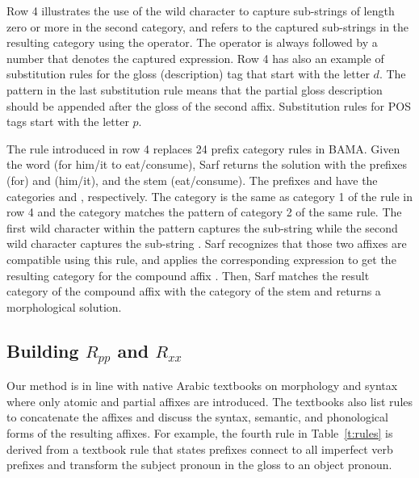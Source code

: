 Row 4 illustrates the use of the wild character \chci{*} to capture sub-strings of length zero or more in the second category,
and refers to the captured sub-strings in the resulting category using the  operator. 
The  operator is always followed by a number that denotes the captured \chci{*} expression.
Row 4 has also an example of substitution rules for the gloss (description) tag that start with the letter $d$.
The  pattern in the last substitution rule means that the  partial gloss description should be appended after the gloss 
of the second affix.
Substitution rules for POS tags start with the letter $p$.

The rule introduced in row 4 replaces 24 prefix category rules in BAMA. 
Given the word  (for him/it to eat/consume), 
Sarf returns the solution with the prefixes  (for) and  (him/it), 
and the stem  (eat/consume). 
The prefixes  and  have the categories 
 and , respectively. 
The category  is the same as category 1 of the rule in row 4 and 
the category  matches the pattern of category 2 of the same rule. 
The first wild character within the pattern captures the sub-string  
while the second wild character captures the sub-string . 
Sarf recognizes that those two affixes are compatible using this rule, 
and applies the corresponding expression to get the resulting category 
 for the compound affix . 
Then, Sarf matches the result category of the compound affix 
with the category  of the stem  
and returns a morphological solution.

\subsection{Building $R_{pp}$ and $R_{xx}$}
\label{ss:affix-affix}

Our method is in line with native Arabic textbooks on morphology and syntax~\citep*{Mosad09,Abd00,Abd001} 
where only atomic and partial affixes are introduced.
The textbooks also list rules to concatenate the affixes and discuss the syntax, semantic, and phonological forms of the
resulting affixes. 
For example, the fourth rule in Table~\ref{t:rules} is derived from a textbook rule that states 
 prefixes connect to all imperfect verb prefixes and transform the subject pronoun in the gloss 
to an object pronoun.

